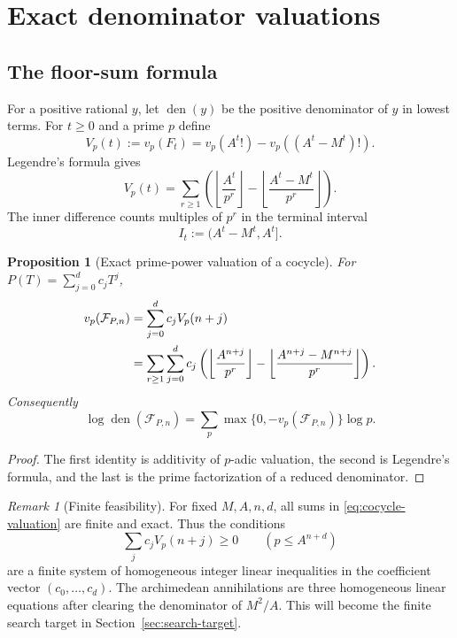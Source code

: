 \documentclass[11pt,oneside]{article}
\newtheorem{proposition}[theorem]{Proposition}
\theoremstyle{definition}
\theoremstyle{remark}
\newtheorem{remark}[theorem]{Remark}
\newcommand{\den}{\operatorname{den}}
\newcommand{\cF}{\mathcal F}
\begin{document}
\section{Exact denominator valuations}
\label{sec:valuations}

\subsection{The floor-sum formula}

For a positive rational $y$, let $\den(y)$ be the positive denominator of $y$ in lowest
terms.  For $t\ge0$ and a prime $p$ define
\begin{equation}
 V_p(t):=v_p(F_t)
 =v_p(A^t!)-v_p((A^t-M^t)!).
 \label{eq:Vp-t}
\end{equation}
Legendre's formula gives
\begin{equation}
 V_p(t)=\sum_{r\ge1}
 \left(
   \left\lfloor\frac{A^t}{p^r}\right\rfloor
  -\left\lfloor\frac{A^t-M^t}{p^r}\right\rfloor
 \right).
 \label{eq:Vp-floor}
\end{equation}
The inner difference counts multiples of $p^r$ in the terminal interval
\begin{equation}
 I_t:=(A^t-M^t,A^t].
 \label{eq:It}
\end{equation}

\begin{proposition}[Exact prime-power valuation of a cocycle]
\label{prop:cocycle-valuation}
For $P(T)=\sum_{j=0}^dc_jT^j$,
\begin{align}
 v_p(\cF_{P,n})
 &=\sum_{j=0}^dc_jV_p(n+j)\notag\\
 &=\sum_{r\ge1}\sum_{j=0}^dc_j
 \left(
   \left\lfloor\frac{A^{n+j}}{p^r}\right\rfloor
  -\left\lfloor\frac{A^{n+j}-M^{n+j}}{p^r}\right\rfloor
 \right).
 \label{eq:cocycle-valuation}
\end{align}
Consequently
\begin{equation}
 \log\den(\cF_{P,n})
 =\sum_p\max\{0,-v_p(\cF_{P,n})\}\log p.
 \label{eq:den-log}
\end{equation}
\end{proposition}

\begin{proof}
The first identity is additivity of $p$-adic valuation, the second is Legendre's formula, and
the last is the prime factorization of a reduced denominator.
\end{proof}

\begin{remark}[Finite feasibility]
For fixed $M,A,n,d$, all sums in \eqref{eq:cocycle-valuation} are finite and exact.  Thus the
conditions
\begin{equation}
 \sum_jc_jV_p(n+j)\ge0\qquad(p\le A^{n+d})
 \label{eq:integrality-linear-inequalities}
\end{equation}
are a finite system of homogeneous integer linear inequalities in the coefficient vector
$(c_0,\ldots,c_d)$.  The archimedean annihilations are three homogeneous linear equations
after clearing the denominator of $M^2/A$.  This will become the finite search target in
Section~\ref{sec:search-target}.
\end{remark}
\end{document}
